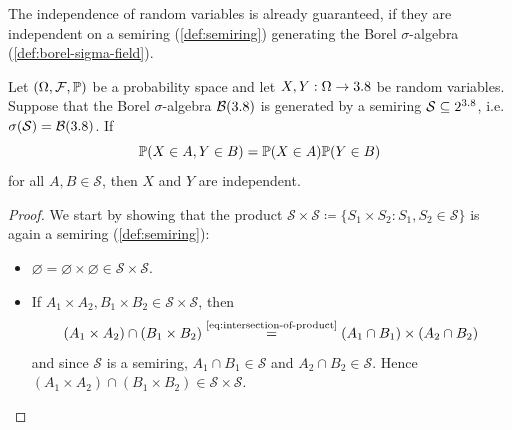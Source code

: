 The independence of random variables is already guaranteed, if they are independent on a semiring (\autoref{def:semiring}) generating the Borel $\sigma$-algebra (\autoref{def:borel-sigma-field}).
\begin{theorem}
Let $(\Omega, \mathcal{F}, \mathbb{P})$ be a probability space and let $X, Y : \Omega \to 3.8$ be random variables.
Suppose that the Borel $\sigma$-algebra $\mathcal{B}(3.8)$ is generated by a semiring $\mathcal{S} \subseteq 2^{3.8}$, i.e. $\sigma(\mathcal{S}) = \mathcal{B}(3.8)$.
If 
\[
\mathbb{P}(X \in A, Y \in B) = \mathbb{P}(X \in A) \mathbb{P}(Y \in B)
\]
for all $A, B \in \mathcal{S}$, then $X$ and $Y$ are independent.
\end{theorem}
\begin{proof}
We start by showing that the product $\mathcal{S} \times \mathcal{S} \coloneq \{S_1 \times S_2 : S_1, S_2 \in \mathcal{S}\}$ is again a semiring (\autoref{def:semiring}):
\begin{itemize}
\item 
$\varnothing = \varnothing \times \varnothing \in \mathcal{S} \times \mathcal{S}$. \cmark
\item 
If $A_1 \times A_2, B_1 \times B_2 \in \mathcal{S} \times \mathcal{S}$, then
\[
(A_1 \times A_2) \cap (B_1 \times B_2)
\overset{\text{\eqref{eq:intersection-of-product}}}{=}
(A_1 \cap B_1) \times (A_2 \cap B_2)
\]
and since $\mathcal{S}$ is a semiring, $A_1 \cap B_1 \in \mathcal{S}$ and $A_2 \cap B_2 \in \mathcal{S}$.
Hence $(A_1 \times A_2) \cap (B_1 \times B_2) \allowbreak \in \allowbreak \mathcal{S} \allowbreak \times \allowbreak \mathcal{S}$. \cmark

\end{itemize}
\end{proof}
